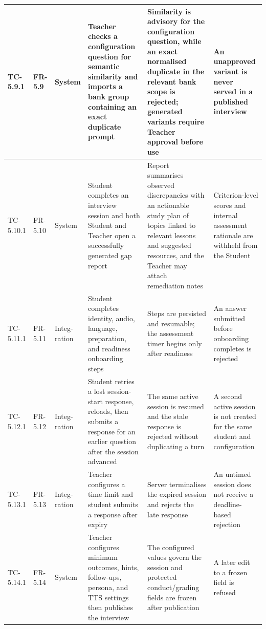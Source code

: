 \begin{longtable}{|>{\centering\arraybackslash}m{}|>{\centering\arraybackslash}m{}|>{\centering\arraybackslash}m{}|m{}|m{}|m{}|}
TC-5.9.1 & FR-5.9 & System & Teacher checks a configuration question for semantic similarity and imports a bank group containing an exact duplicate prompt & Similarity is advisory for the configuration question, while an exact normalised duplicate in the relevant bank scope is rejected; generated variants require Teacher approval before use & An unapproved variant is never served in a published interview \\ \hline

TC-5.10.1 & FR-5.10 & System & Student completes an interview session and both Student and Teacher open a successfully generated gap report & Report summarises observed discrepancies with an actionable study plan of topics linked to relevant lessons and suggested resources, and the Teacher may attach remediation notes & Criterion-level scores and internal assessment rationale are withheld from the Student \\ \hline

TC-5.11.1 & FR-5.11 & Integ-ration & Student completes identity, audio, language, preparation, and readiness onboarding steps & Steps are persisted and resumable; the assessment timer begins only after readiness & An answer submitted before onboarding completes is rejected \\ \hline

TC-5.12.1 & FR-5.12 & Integ-ration & Student retries a lost session-start response, reloads, then submits a response for an earlier question after the session advanced & The same active session is resumed and the stale response is rejected without duplicating a turn & A second active session is not created for the same student and configuration \\ \hline

TC-5.13.1 & FR-5.13 & Integ-ration & Teacher configures a time limit and student submits a response after expiry & Server terminalises the expired session and rejects the late response & An untimed session does not receive a deadline-based rejection \\ \hline

TC-5.14.1 & FR-5.14 & System & Teacher configures minimum outcomes, hints, follow-ups, persona, and TTS settings then publishes the interview & The configured values govern the session and protected conduct/grading fields are frozen after publication & A later edit to a frozen field is refused \\ \hline


\end{longtable}
